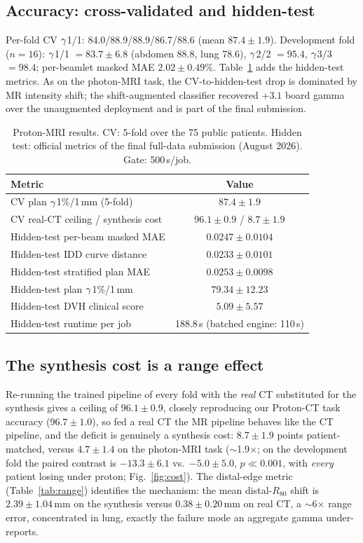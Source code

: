 \documentclass{llncs}
\begin{document}
\subsection{Accuracy: cross-validated and hidden-test}
Per-fold CV $\gamma$1/1: 84.0/88.9/88.9/86.7/88.6 (mean $87.4\pm1.9$). Development fold ($n=16$):
$\gamma$1/1 $=83.7\pm6.8$ (abdomen 88.8, lung 78.6), $\gamma$2/2 $=95.4$, $\gamma$3/3 $=98.4$;
per-beamlet masked MAE $2.02\pm0.49$\%. Table~\ref{tab:res} adds the hidden-test metrics. As on
the photon-MRI task, the CV-to-hidden-test drop is dominated by MR intensity shift; the
shift-augmented classifier recovered $+3.1$ board gamma over the unaugmented deployment and is
part of the final submission.

\begin{table}[t]\centering
\caption{Proton-MRI results. CV: 5-fold over the 75 public patients. Hidden test: official
metrics of the final full-data submission (August 2026). Gate: 500\,s/job.}\label{tab:res}
\begin{tabular}{@{}lc@{}}\toprule
Metric & Value\\\midrule
CV plan $\gamma$1\%/1\,mm (5-fold) & $87.4\pm1.9$\\
CV real-CT ceiling / synthesis cost & $96.1\pm0.9$ / $8.7\pm1.9$\\
Hidden-test per-beam masked MAE & $0.0247\pm0.0104$\\
Hidden-test IDD curve distance & $0.0233\pm0.0101$\\
Hidden-test stratified plan MAE & $0.0253\pm0.0098$\\
Hidden-test plan $\gamma$1\%/1\,mm & $79.34\pm12.23$\\
Hidden-test DVH clinical score & $5.09\pm5.57$\\
Hidden-test runtime per job & 188.8\,s (batched engine: 110\,s)\\\bottomrule
\end{tabular}\end{table}

\subsection{The synthesis cost is a range effect}
Re-running the trained pipeline of every fold with the \emph{real} CT substituted for the
synthesis gives a ceiling of $96.1\pm0.9$, closely reproducing our Proton-CT task accuracy
($96.7\pm1.0$), so fed a real CT the MR pipeline behaves like the CT pipeline, and the deficit
is genuinely a synthesis cost: $8.7\pm1.9$ points patient-matched, versus $4.7\pm1.4$ on the
photon-MRI task ($\sim$1.9$\times$; on the development fold the paired contrast is
$-13.3\pm6.1$ vs.\ $-5.0\pm5.0$, $p\ll0.001$, with \emph{every} patient losing under proton;
Fig.~\ref{fig:cost}). The distal-edge metric (Table~\ref{tab:range}) identifies the mechanism:
the mean distal-$R_{80}$ shift is $2.39\pm1.04$\,mm on the synthesis versus $0.38\pm0.20$\,mm on
real CT, a $\sim$6$\times$ range error, concentrated in lung, exactly the failure mode an
aggregate gamma under-reports.
\end{document}
